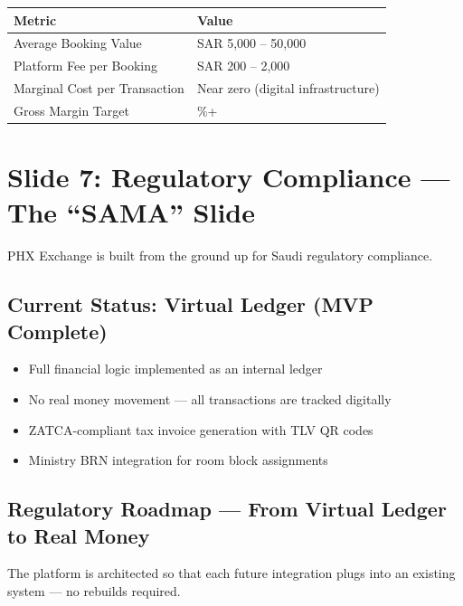 \documentclass[11pt,a4paper]{article}
\providecommand{\tightlist}{%
  \setlength{\itemsep}{0pt}\setlength{\parskip}{0pt}}
\begin{document}
\begin{center}
\begin{tabular}{|>{\raggedright\arraybackslash}p{5cm}|>{\raggedright\arraybackslash}p{9cm}|}
\hline
\rowcolor{headergray}
\textbf{Metric} & \textbf{Value} \\
\hline
Average Booking Value & SAR 5,000 -- 50,000 \\
\hline
Platform Fee per Booking & SAR 200 -- 2,000 \\
\hline
Marginal Cost per Transaction & Near zero (digital infrastructure) \\
\hline
Gross Margin Target & 85\%+ \\
\hline
\end{tabular}
\end{center}

\newpage

\section*{Slide 7: Regulatory Compliance --- The ``SAMA'' Slide}

PHX Exchange is built from the ground up for Saudi regulatory compliance.

\subsection*{Current Status: Virtual Ledger (MVP Complete)}
\begin{itemize}
\tightlist
\item Full financial logic implemented as an internal ledger
\item No real money movement --- all transactions are tracked digitally
\item ZATCA-compliant tax invoice generation with TLV QR codes
\item Ministry BRN integration for room block assignments
\end{itemize}

\subsection*{Regulatory Roadmap --- From Virtual Ledger to Real Money}

The platform is architected so that each future integration plugs into an existing system --- no rebuilds required.

\vspace{0.3cm}
\end{document}

